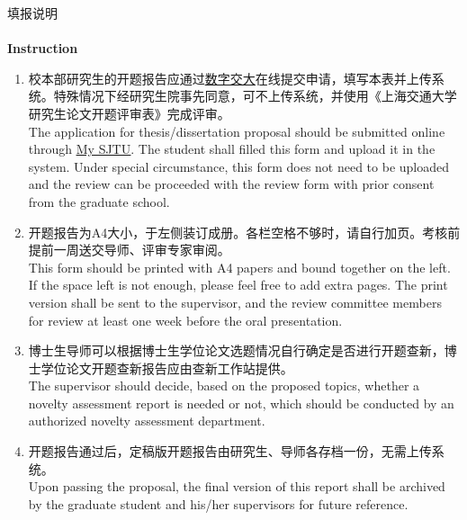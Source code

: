 \documentclass[zihao=-4,a4paper,fontset=fandol]{ctexart}
\begin{document}
\clearpage


\begin{center}
    \vspace*{0.5cm}
    {\heiti 填\quad 报\quad 说\quad 明}\\~\\
    {\bfseries Instruction}
\end{center}

\begin{enumerate}
    \item {\fangsong 校本部研究生的开题报告应通过\href{http://my.sjtu.edu.cn/}{\color{blue}\underline{数字交大}}在线提交申请，填写本表并上传系统。特殊情况下经研究生院事先同意，可不上传系统，并使用《上海交通大学研究生论文开题评审表》完成评审。}\\[0.5\baselineskip]
          The application for thesis/dissertation proposal should be submitted online through \href{http://my.sjtu.edu.cn/}{\color{blue}\underline{My SJTU}}. The student shall filled this form and upload it in the system. Under special circumstance, this form does not need to be uploaded and the review can be proceeded with the review form with prior consent from the graduate school.

    \item {\fangsong 开题报告为A4大小，于左侧装订成册。各栏空格不够时，请自行加页。考核前提前一周送交导师、评审专家审阅。}\\[0.5\baselineskip]
          This form should be printed with A4 papers and bound together on the left. If the space left is not enough, please feel free to add extra pages. The print version shall be sent to the supervisor, and the review committee members for review at least one week before the oral presentation.

    \item {\fangsong 博士生导师可以根据博士生学位论文选题情况自行确定是否进行开题查新，博士学位论文开题查新报告应由查新工作站提供。}\\[0.5\baselineskip]
          The supervisor should decide, based on the proposed topics, whether a novelty assessment report is needed or not, which should be conducted by an authorized novelty assessment department.

    \item {\fangsong 开题报告通过后，定稿版开题报告由研究生、导师各存档一份，无需上传系统。}\\[0.5\baselineskip]
          Upon passing the proposal, the final version of this report shall be archived by the graduate student and his/her supervisors for future reference.


\end{enumerate}
\end{document}
